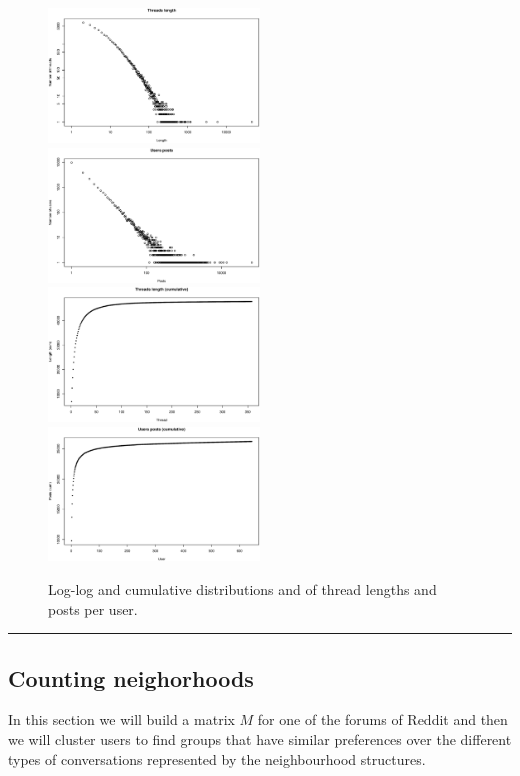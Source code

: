 \documentclass[9pt,technote]{IEEEtran}
\begin{document}
\begin{figure}
\centering
\includegraphics[width=0.5\textwidth]{threads_length}%
\includegraphics[width=0.5\textwidth]{users_posts}
\includegraphics[width=0.5\textwidth]{threads_length_cum}%
\includegraphics[width=0.5\textwidth]{users_posts_cum}
\caption{Log-log and cumulative distributions and of thread lengths and posts per user.}
\label{fig:podemos_distributions}
\end{figure}

    \noindent\textcolor{red}{\rule{16cm}{1mm}}
\subsection{Counting neighorhoods}
In this section we will build a matrix $M$ for one of the forums of Reddit and then we will cluster users to find groups that have similar preferences over the different types of conversations represented by the neighbourhood structures. 
\end{document}
